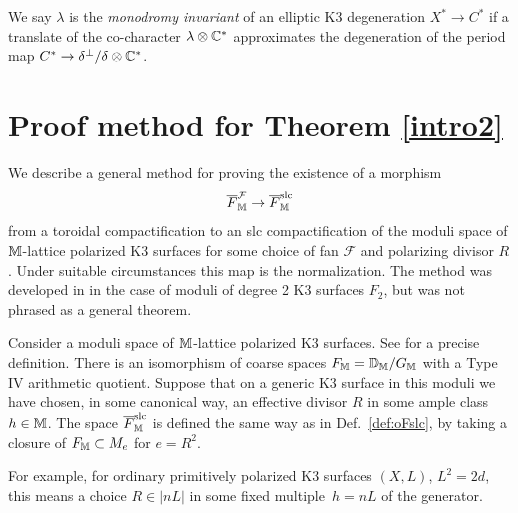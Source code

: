 \documentclass[table,x11names]{amsart}
\begin{document}
\begin{definition} We say $\lambda$ is the {\it monodromy invariant}
of an elliptic K3 degeneration $X^*\to C^*$ if a translate of the co-character
$\lambda\otimes \mathbb{C}^*$ approximates the degeneration
of the period map $C^*\to \delta^\perp/\delta\otimes \mathbb{C}^*$. \end{definition}


\section{Proof method for Theorem \ref{intro2}}   
\label{sec:method}

We describe a general method for proving the existence of a morphism 
$${\overline F}_{\mathbb M}^\mathcal{F}\to {\overline F}_{\mathbb M}^{\rm slc}$$
from a toroidal compactification to an slc compactification
of the moduli space of ${\mathbb M}$-lattice polarized K3 surfaces
for
some choice of fan $\mathcal{F}$ and polarizing divisor $R$. Under suitable
circumstances this map is the normalization.
The method was developed in
\cite{alexeev2019stable-pair} in the case of moduli of degree 2 K3 surfaces $F_2$,
but was not phrased as a general theorem.

Consider a moduli space of ${\mathbb M}$-lattice polarized K3
surfaces. See \cite[Def.~2.33]{alexeev2021compact} for a precise definition.
There is an isomorphism of coarse spaces $F_{{\mathbb M}}={\mathbb D}_{\mathbb M}/G_{\mathbb M}$
\cite[Thm.~2.34]{alexeev2021compact} with a Type IV arithmetic quotient.
Suppose that on a generic K3 surface in this moduli we have
chosen, in some canonical way, an effective divisor $R$ in some ample
class $h\in{\mathbb M}$. The space ${\overline F}_{\mathbb M}^{\rm slc}$ is defined the same way as in
Def.~\ref{def:oFslc}, by taking a closure of $F_{\mathbb M}\subset M_e$ for $e=R^2$.

For example, for ordinary primitively polarized K3
surfaces $(X,L)$, $L^2=2d$, this means a choice $R\in |nL|$ in some
fixed multiple~$h=nL$ of the generator.
   
\end{document}
